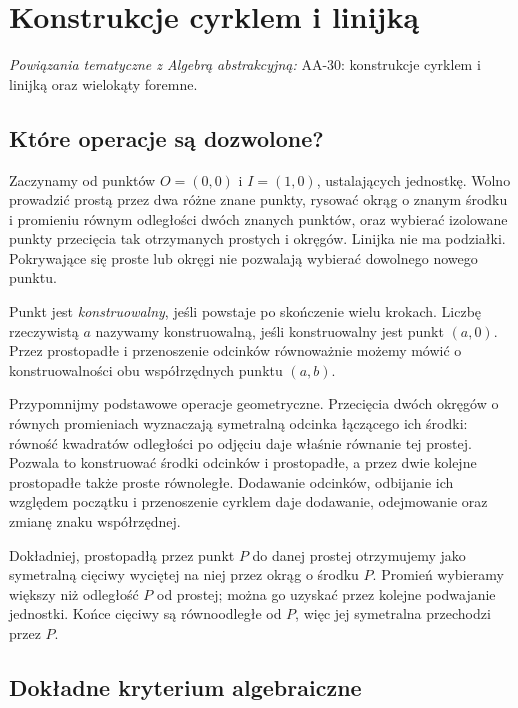 \chapter{Konstrukcje cyrklem i linijką}

\providecommand{\atlasref}[2]{#2}
\noindent\emph{Powiązania tematyczne z Algebrą abstrakcyjną:} \atlasref{AA-30::aa:ch:constructibility}{AA-30: konstrukcje cyrklem i linijką oraz wielokąty foremne}.


\section{Które operacje są dozwolone?}

Zaczynamy od punktów $O=(0,0)$ i $I=(1,0)$, ustalających jednostkę. Wolno prowadzić prostą przez dwa różne znane punkty, rysować okrąg o znanym środku i promieniu równym odległości dwóch znanych punktów, oraz wybierać izolowane punkty przecięcia tak otrzymanych prostych i okręgów. Linijka nie ma podziałki. Pokrywające się proste lub okręgi nie pozwalają wybierać dowolnego nowego punktu.

Punkt jest \emph{konstruowalny}, jeśli powstaje po skończenie wielu krokach. Liczbę rzeczywistą $a$ nazywamy konstruowalną, jeśli konstruowalny jest punkt $(a,0)$. Przez prostopadłe i przenoszenie odcinków równoważnie możemy mówić o konstruowalności obu współrzędnych punktu $(a,b)$.

Przypomnijmy podstawowe operacje geometryczne. Przecięcia dwóch okręgów o równych promieniach wyznaczają symetralną odcinka łączącego ich środki: równość kwadratów odległości po odjęciu daje właśnie równanie tej prostej. Pozwala to konstruować środki odcinków i prostopadłe, a przez dwie kolejne prostopadłe także proste równoległe. Dodawanie odcinków, odbijanie ich względem początku i przenoszenie cyrklem daje dodawanie, odejmowanie oraz zmianę znaku współrzędnej.

Dokładniej, prostopadłą przez punkt $P$ do danej prostej otrzymujemy jako symetralną cięciwy wyciętej na niej przez okrąg o środku $P$. Promień wybieramy większy niż odległość $P$ od prostej; można go uzyskać przez kolejne podwajanie jednostki. Końce cięciwy są równoodległe od $P$, więc jej symetralna przechodzi przez $P$.

\section{Dokładne kryterium algebraiczne}

